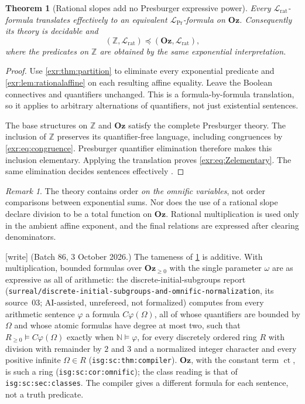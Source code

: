 \documentclass[11pt,letterpaper]{article}
\numberwithin{equation}{section}
\newtheorem{theorem}{Theorem}[section]
\theoremstyle{definition}
\theoremstyle{remark}
\newtheorem{remark}[remark]{Remark}
\newcommand{\Oz}{\mathbf{Oz}}
\newcommand{\Z}{\mathbb Z}
\newcommand{\N}{\mathbb N}
\newcommand{\Lrat}{\mathcal L_{\mathrm{rat}}}
\newcommand{\LPr}{\mathcal L_{\mathrm{Pr}}}
\newcommand{\ct}{\operatorname{ct}}
\newcommand{\rpath}[1]{\nolinkurl{#1}}%
\newcommand{\lbl}[1]{\nolinkurl{#1}}%
\newcommand{\wtag}{\textup{[write]}}%
\begin{document}
\begin{theorem}[Rational slopes add no Presburger expressive power]\label{exr:thm:rational}
Every $\Lrat$-formula translates effectively to an equivalent $\LPr$-formula on
$\Oz$. Consequently its theory is decidable and
\begin{equation}\label{exr:eq:Zelementary}
 (\Z,\Lrat)\preccurlyeq(\Oz,\Lrat),
\end{equation}
where the predicates on $\Z$ are obtained by the same exponential interpretation.
\end{theorem}
\begin{proof}
Use \cref{exr:thm:partition} to eliminate every exponential predicate and
\cref{exr:lem:rationalaffine} on each resulting affine equality. Leave the Boolean
connectives and quantifiers unchanged. This is a formula-by-formula translation,
so it applies to arbitrary alternations of quantifiers, not just existential
sentences.

The base structures on $\Z$ and $\Oz$ satisfy the complete Presburger theory.
The inclusion of $\Z$ preserves its quantifier-free language, including congruences
by \eqref{exr:eq:congruence}. Presburger quantifier elimination therefore makes this
inclusion elementary. Applying the translation proves \eqref{exr:eq:Zelementary}.
The same elimination decides sentences effectively \cite{cluckers}.
\end{proof}

\begin{remark}
The theory contains order \emph{on the omnific variables}, not order comparisons
between exponential sums. Nor does the use of a rational slope declare division
to be a total function on $\Oz$. Rational multiplication is used only in the
ambient affine exponent, and the final relations are expressed after clearing
denominators.
\end{remark}

\wtag{} (Batch 86, 3 October 2026.) The tameness of \cref{exr:thm:rational}
is additive. With multiplication, bounded formulas over $\Oz_{\ge0}$ with the
single parameter $\omega$ are as expressive as all of arithmetic: the
discrete-initial-subgroups report
(\rpath{surreal/discrete-initial-subgroups-and-omnific-normalization}, its
source~03; AI-assisted, unrefereed, not formalized) computes from every
arithmetic sentence $\varphi$ a formula $C\varphi(\Omega)$, all of whose
quantifiers are bounded by $\Omega$ and whose atomic formulas have degree at
most two, such that $R_{\ge0}\models C\varphi(\Omega)$ exactly when
$\N\models\varphi$, for every discretely ordered ring $R$ with division with
remainder by $2$ and $3$ and a normalized integer character and every positive infinite
$\Omega\in R$ (\lbl{isg:sc:thm:compiler}). $\Oz$, with the constant term
$\ct$, is such a ring (\lbl{isg:sc:cor:omnific}); the class reading is that
of \lbl{isg:sc:sec:classes}. The compiler gives a different formula for each
sentence, not a truth predicate.
\end{document}
